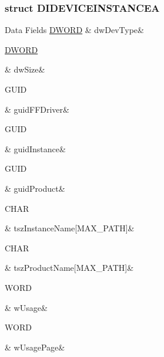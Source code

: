 \subsubsection{struct D\-I\-D\-E\-V\-I\-C\-E\-I\-N\-S\-T\-A\-N\-C\-E\-A}
\begin{DoxyFields}{Data Fields}
\hypertarget{a00003_a2bdaf065880c5cb7fa08be0bf17027a6}{\hyperlink{a00003_a50e15ae51c87ae06ab29c8148cb5f36c}{D\-W\-O\-R\-D}}\label{a00003_a2bdaf065880c5cb7fa08be0bf17027a6}
&
dw\-Dev\-Type&
\\
\hline

\hypertarget{a00003_a669c5a85f5a9eb97e64ad880fadaaa2d}{\hyperlink{a00003_a50e15ae51c87ae06ab29c8148cb5f36c}{D\-W\-O\-R\-D}}\label{a00003_a669c5a85f5a9eb97e64ad880fadaaa2d}
&
dw\-Size&
\\
\hline

\hypertarget{a00003_a62f782d9ced1e758acfba8f1dfe6906b}{G\-U\-I\-D}\label{a00003_a62f782d9ced1e758acfba8f1dfe6906b}
&
guid\-F\-F\-Driver&
\\
\hline

\hypertarget{a00003_a7fba3dbe50344a5643d4b3c3ae186576}{G\-U\-I\-D}\label{a00003_a7fba3dbe50344a5643d4b3c3ae186576}
&
guid\-Instance&
\\
\hline

\hypertarget{a00003_a30bf31754fdd016b11557bf6a75bfc87}{G\-U\-I\-D}\label{a00003_a30bf31754fdd016b11557bf6a75bfc87}
&
guid\-Product&
\\
\hline

\hypertarget{a00003_a0c2016d4a69c9474b7cdf714abb66217}{C\-H\-A\-R}\label{a00003_a0c2016d4a69c9474b7cdf714abb66217}
&
tsz\-Instance\-Name\mbox{[}M\-A\-X\-\_\-\-P\-A\-T\-H\mbox{]}&
\\
\hline

\hypertarget{a00003_ace2ea209eb411d1e909d9bb3e326d5bb}{C\-H\-A\-R}\label{a00003_ace2ea209eb411d1e909d9bb3e326d5bb}
&
tsz\-Product\-Name\mbox{[}M\-A\-X\-\_\-\-P\-A\-T\-H\mbox{]}&
\\
\hline

\hypertarget{a00003_a0d3e1ceaeb1960389350277978573941}{W\-O\-R\-D}\label{a00003_a0d3e1ceaeb1960389350277978573941}
&
w\-Usage&
\\
\hline

\hypertarget{a00003_ab55ab386802010c34f363f9a2615be89}{W\-O\-R\-D}\label{a00003_ab55ab386802010c34f363f9a2615be89}
&
w\-Usage\-Page&
\\
\hline

\end{DoxyFields}
\label{d9/da5/a00075}
\hypertarget{a00003_d9/da5/a00075}{}
